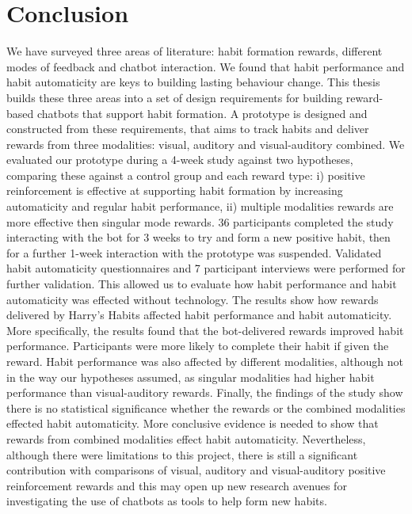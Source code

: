 \section{Conclusion}
We have surveyed three areas of literature: habit formation rewards, different modes of feedback and chatbot interaction. We found that habit performance and habit automaticity are keys to building lasting behaviour change. This thesis builds these three areas into a set of design requirements for building reward-based chatbots that support habit formation.
A prototype is designed and constructed from these requirements, that aims to track habits and deliver rewards from three modalities: visual, auditory and visual-auditory combined.
We evaluated our prototype during a 4-week study against two hypotheses, comparing these against a control group and each reward type: i) positive reinforcement is effective at supporting habit formation by increasing automaticity and regular habit performance, ii) multiple modalities rewards are more effective then singular mode rewards. 36 participants completed the study interacting with the bot for 3 weeks to try and form a new positive habit, then for a further 1-week interaction with the prototype was suspended. Validated habit automaticity questionnaires and 7 participant interviews were performed for further validation. This allowed us to evaluate how habit performance and habit automaticity was effected without technology. The results show how rewards delivered by Harry's Habits affected habit performance and habit automaticity.
More specifically,
the results found that the bot-delivered rewards improved habit performance. Participants were more likely to complete their habit if given the reward. Habit performance was also affected by different modalities, although not in the way our hypotheses assumed, as singular modalities had higher habit performance than visual-auditory rewards. Finally, the findings of the study show there is no statistical significance whether the rewards or the combined modalities effected habit automaticity. More conclusive evidence is needed to show that rewards from combined modalities effect habit automaticity. Nevertheless, although there were limitations to this project, there is still a significant contribution with comparisons of visual, auditory and visual-auditory positive reinforcement rewards and this may open up new research avenues for investigating the use of chatbots as tools to help form new habits.
